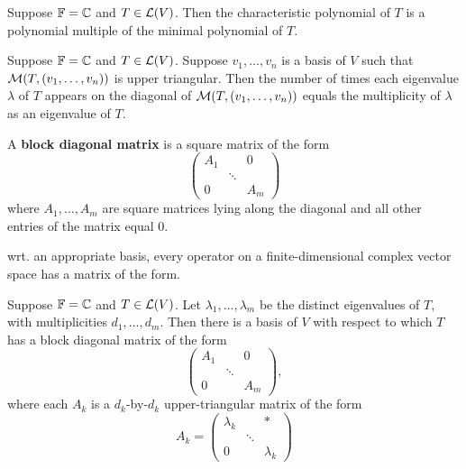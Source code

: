 \documentclass{extarticle}
\begin{document}
\begin{corollary}
    Suppose \(\mathbb{F} = \mathbb{C}\) and \(T \in \mathcal{L}(V)\). Then the characteristic polynomial of \(T\) is 
    a polynomial multiple of the minimal polynomial of \(T\).
\end{corollary}


\begin{thm}
    Suppose \(\mathbb{F} = \mathbb{C}\) and \(T \in \mathcal{L}(V)\). Suppose \(v_1, \ldots, v_n\) is a basis of 
    \(V\) such that \(\mathcal{M}(T, (v_1, \ldots, v_n))\) is upper triangular. Then the number 
    of times each eigenvalue \(\lambda\) of \(T\) appears on the diagonal of 
    \(\mathcal{M}(T, (v_1, \ldots, v_n))\) equals the multiplicity of \(\lambda\) as an eigenvalue 
    of \(T\).
\end{thm}

\begin{definition}
    A \textbf{block diagonal matrix} is a square matrix of the form 
    \[\begin{pmatrix}
        A_1 & & 0 \\ 
        & \ddots &  \\ 
        0 & & A_m 
    \end{pmatrix}\]
    where \(A_1, \ldots, A_m\) are square matrices lying along the diagonal and all other 
    entries of the matrix equal 0.
\end{definition}

\begin{remark}
    wrt. an appropriate basis, every operator on a finite-dimensional complex vector space 
    has a matrix of the form. 
\end{remark}

\begin{thm}
    Suppose \(\mathbb{F} = \mathbb{C}\) and \(T \in \mathcal{L}(V)\). Let \(\lambda_1, \ldots, \lambda_m\) be the 
    distinct eigenvalues of \(T\), with multiplicities \(d_1, \ldots, d_m\). Then there is a basis 
    of \(V\) with respect to which \(T\) has a block diagonal matrix of the form
    \[\begin{pmatrix}
        A_1 & & 0 \\ 
        & \ddots & \\ 
        0 & & A_m 
    \end{pmatrix},\]
    where each \(A_k\) is a \(d_k\)-by-\(d_k\) upper-triangular matrix of the form 
    \[ 
        A_k = \begin{pmatrix}
            \lambda_k & & * \\ 
            & \ddots & \\ 
            0 & & \lambda_k
        \end{pmatrix}  \]
\end{thm}
\end{document}
